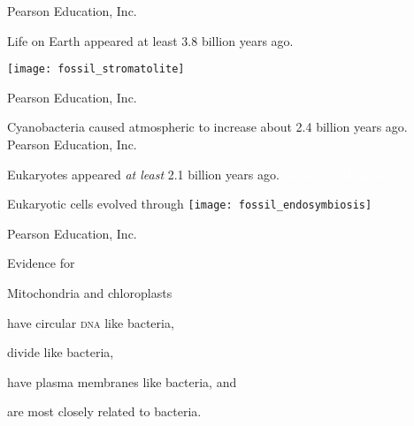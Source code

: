 \documentclass[t]{beamer}
\begin{document}
%
{
\begin{frame}[b]
\hfill \tiny \textcopyright Pearson Education, Inc.
\end{frame}
}
%
\begin{frame}[t]{Life on Earth appeared at least 3.8 billion years ago.}

	\texttt{[image: fossil\_stromatolite]}
	
	\vfilll
	
	\hfill \tiny \textcopyright Pearson Education, Inc.
\end{frame}

{
\begin{frame}[b]{Cyanobacteria caused atmospheric  to increase about 2.4 billion years ago.}
\tiny \textcopyright Pearson Education, Inc.
\end{frame}
}
%
{
\begin{frame}[b]{Eukaryotes appeared \emph{at least} 2.1 billion years ago.}
\tiny \textcolor{white}{Xvazquez, Wikimedia, }
\end{frame}
}
%
\begin{frame}[t]{Eukaryotic cells evolved through }
	\texttt{[image: fossil\_endosymbiosis]}
	
	\vfilll
	
	\hfill \tiny \textcopyright Pearson Education, Inc.
\end{frame}

\begin{frame}[t]{Evidence for  }

	\hangpara Mitochondria and chloroplasts
	
	\hangpara \hspace*{1em} have circular \textsc{dna} like bacteria,
	
	\hangpara \hspace*{1em} divide like bacteria,
	
	\hangpara \hspace*{1em} have plasma membranes like bacteria, and
	
	\hangpara \hspace*{1em} are most closely related to bacteria.
	
\end{frame}
\end{document}
